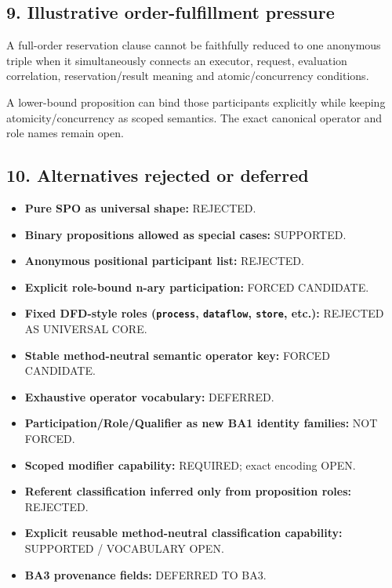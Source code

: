 \documentclass[
  10pt,
  letterpaper,
]{article}
\providecommand{\tightlist}{%
  \setlength{\itemsep}{0pt}\setlength{\parskip}{0pt}}
\begin{document}
\subsection{9. Illustrative order-fulfillment
pressure}\label{illustrative-order-fulfillment-pressure}

A full-order reservation clause cannot be faithfully reduced to one
anonymous triple when it simultaneously connects an executor, request,
evaluation correlation, reservation/result meaning and
atomic/concurrency conditions.

A lower-bound proposition can bind those participants explicitly while
keeping atomicity/concurrency as scoped semantics. The exact canonical
operator and role names remain open.

\subsection{10. Alternatives rejected or
deferred}\label{alternatives-rejected-or-deferred}

\begin{itemize}
\tightlist
\item
  \textbf{Pure SPO as universal shape:} REJECTED.
\item
  \textbf{Binary propositions allowed as special cases:} SUPPORTED.
\item
  \textbf{Anonymous positional participant list:} REJECTED.
\item
  \textbf{Explicit role-bound n-ary participation:} FORCED CANDIDATE.
\item
  \textbf{Fixed DFD-style roles (\texttt{process}, \texttt{dataflow},
  \texttt{store}, etc.):} REJECTED AS UNIVERSAL CORE.
\item
  \textbf{Stable method-neutral semantic operator key:} FORCED
  CANDIDATE.
\item
  \textbf{Exhaustive operator vocabulary:} DEFERRED.
\item
  \textbf{Participation/Role/Qualifier as new BA1 identity families:}
  NOT FORCED.
\item
  \textbf{Scoped modifier capability:} REQUIRED; exact encoding OPEN.
\item
  \textbf{Referent classification inferred only from proposition roles:}
  REJECTED.
\item
  \textbf{Explicit reusable method-neutral classification capability:}
  SUPPORTED / VOCABULARY OPEN.
\item
  \textbf{BA3 provenance fields:} DEFERRED TO BA3.
\end{itemize}
\end{document}

